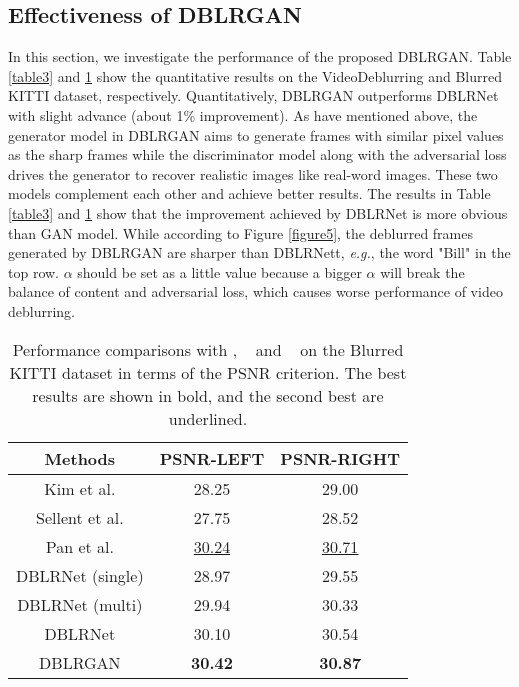 \documentclass[journal]{IEEEtran}
\begin{document}
\subsection{Effectiveness of DBLRGAN}
In this section, we investigate the performance of the proposed DBLRGAN. Table \ref{table3} and \ref{table4} show the quantitative results on the VideoDeblurring and Blurred KITTI dataset, respectively. Quantitatively, DBLRGAN outperforms DBLRNet with slight advance (about 1\% improvement). As have mentioned above, the generator model in DBLRGAN aims to generate frames with similar pixel values as the sharp frames while the discriminator model along with the adversarial loss drives the generator to recover realistic images like real-word images. These two models complement each other and achieve better results.
The results in Table \ref{table3} and \ref{table4} show that the improvement achieved by DBLRNet is more obvious than GAN model. While according to Figure \ref{figure5}, the deblurred frames generated by DBLRGAN are sharper than DBLRNett, \textit{e.g.}, the word "Bill" in the top row. $\alpha$ should be set as a little value because a bigger $\alpha$ will break the balance of content and adversarial loss, which causes worse performance of video deblurring.


\begin{table}
  \centering
    \caption{Performance comparisons with \cite{hyun2015generalized}, ~\cite{sellent2016stereo} and ~\cite{pan2017simultaneous} on the Blurred KITTI dataset in terms of the PSNR criterion. The best results are shown in bold, and the second best are underlined.}
    \begin{tabular}{c|cc}
    \toprule
    Methods & PSNR-LEFT & PSNR-RIGHT \\
    \hline
    Kim et al. & 28.25& 29.00\\
    Sellent et al. & 27.75& 28.52\\
    Pan et al. & \underline{30.24}& \underline{30.71}\\
    \hline
    DBLRNet (single) & 28.97 & 29.55\\
    DBLRNet (multi) & 29.94 & 30.33\\
    DBLRNet & 30.10 & 30.54 \\
    \hline
    DBLRGAN & \textbf{30.42} & \textbf{30.87} \\
    \bottomrule
    \end{tabular}
  \label{table4}
\end{table}
\end{document}
